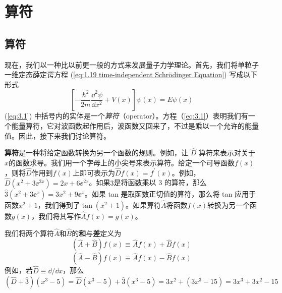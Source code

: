 \chapter{算符}
\label{chap:3}
\section{算符}
	\label{sec:3.1 Operators}
	现在，我们以一种比以前更一般的方式来发展量子力学理论。首先，我们将单粒子一维定态薛定谔方程 (\ref{eq:1.19 time-independent Schrödinger Equation}) 写成以下形式
	\begin{equation}
		\left[-\frac{\hbar^2}{2m}\frac{\dd ^2\psi}{\dd x^2}+V\left(x\right)\right]\psi\left(x\right) = E\psi\left(x\right)
		\label{eq:3.1}
	\end{equation}
	(\ref{eq:3.1}) 中括号内的实体是一个\textit{算符}（operator）。方程（\ref{eq:3.1}）表明我们有一个能量算符，它对波函数起作用后，波函数又回来了，不过是乘以一个允许的能量值。因此，接下来我们讨论算符。

	\textbf{算符}是一种将给定函数转换为另一个函数的规则。例如，让 $\hat{D}$ 算符来表示对关于$x$的函数求导。我们用一个字母上的小尖号来表示算符。给定一个可导函数$f\left(x\right)$，则将$\hat{D}$作用到$f\left(x\right)$上即可表示为$\hat{D}f\left(x\right) = f^{\prime}\left(x\right)$。例如，$\hat{D}\left(x^2+3\ee ^{2x}\right) = 2x+6\ee ^{2x}$。如果$\hat{3}$是将函数乘以 3 的算符，那么$\hat{3}\left(x^2+3\ee ^x\right) = 3x^2+9\ee ^x$。如果 tan 是取函数正切值的算符，那么将 tan 应用于函数$x^2+1$，我们得到了$\tan\left(x^2+1\right)$。如果算符$\hat{A}$将函数$f\left(x\right)$转换为另一个函数$g\left(x\right)$，我们将其写作$\hat{A}f\left(x\right) = g\left(x\right)$。

	我们将两个算符$\hat{A}$和$\hat{B}$的\textbf{和}与\textbf{差}定义为
	\begin{equation}
		\boxed{
			\left(\hat{A}+\hat{B}\right)f\left(x\right) \equiv \hat{A}f\left(x\right)+\hat{B}f\left(x\right)
		}
		\label{eq:3.2 definition of operators' sum and differenct}
	\end{equation}
	\begin{equation*}
		\left(\hat{A}-\hat{B}\right)f\left(x\right) \equiv \hat{A}f\left(x\right)-\hat{B}f\left(x\right)
	\end{equation*}
	例如，若$\hat{D} \equiv \dd /\dd x$，那么
	\begin{equation*}
		\left(\hat{D}+\hat{3}\right)\left(x^3-5\right) = \hat{D}\left(x^3-5\right)+ \hat{3}\left(x^3-5\right) = 3x^2+\left(3x^3-15\right) = 3x^3+3x^2-15
	\end{equation*}

